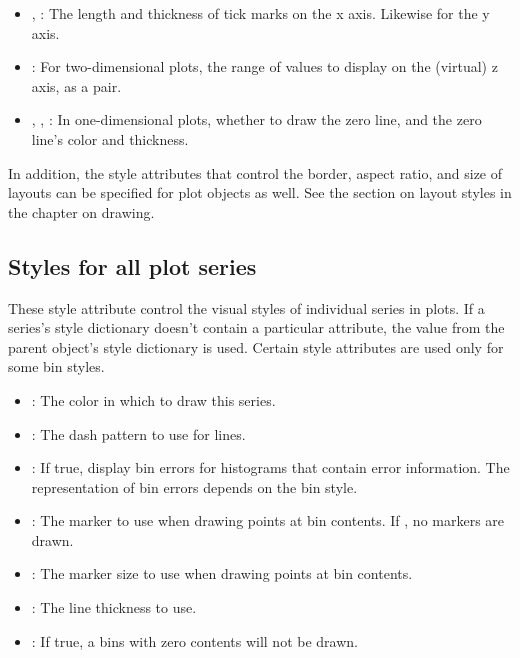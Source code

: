 \begin{itemize}
 \item {}, : The
 length and thickness of tick marks on the x axis.  Likewise for the y
 axis. 

 \item {}: For two-dimensional plots, the range of values
 to display on the (virtual) z axis, as a  pair.

 \item {}, ,
 : In one-dimensional plots, whether to draw
 the zero line, and the zero line's color and thickness.

\end{itemize}

In addition, the style attributes that control the border, aspect ratio,
and size of layouts can be specified for plot objects as well.  See the
section on layout styles in the chapter on drawing.

\subsection{Styles for all plot series}

These style attribute control the visual styles of individual series in
plots.  If a series's style dictionary doesn't contain a particular
attribute, the value from the parent  object's style
dictionary is used.  Certain style attributes are used only for some bin
styles.

\begin{itemize}
 \item {}: The color in which to draw this series.  

 \item {}: The dash pattern to use for lines.

 \item {}: If true, display bin errors for histograms that
 contain error information.  The representation of bin errors depends on
 the bin style.

 \item {}: The marker to use when drawing points at bin
 contents.  If , no markers are drawn.

 \item {}: The marker size to use when drawing points
 at bin contents.

 \item {}: The line thickness to use.

 \item {}: If true, a bins with zero contents
 will not be drawn.

\end{itemize}


